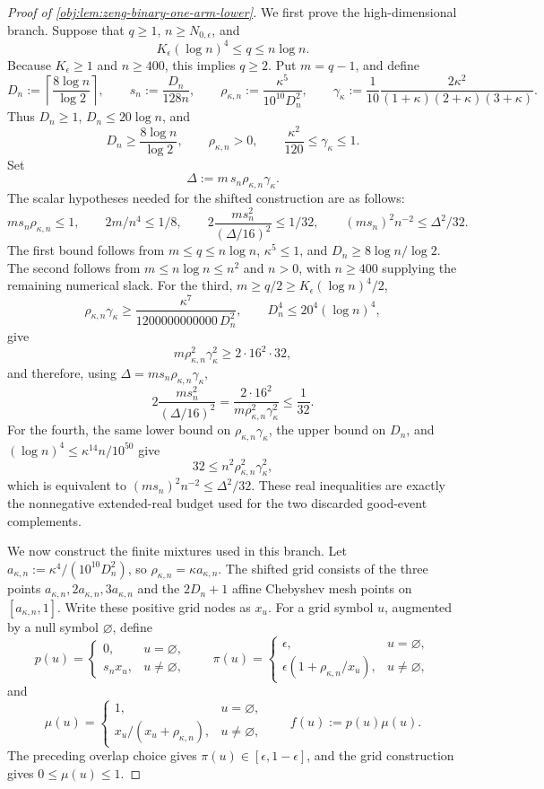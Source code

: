 \documentclass[11pt]{article}
\begin{document}
\begin{proof}[Proof of \cref{obj:lem:zeng-binary-one-arm-lower}]
We first prove the high-dimensional branch.  Suppose that \(q\ge1\), \(n\ge N_{0,\epsilon}\), and
\[
K_\epsilon(\log n)^4\le q\le n\log n .
\]
Because \(K_\epsilon\ge1\) and \(n\ge400\), this implies \(q\ge2\).  Put \(m=q-1\), and define
\[
D_n:=\left\lceil \frac{8\log n}{\log 2}\right\rceil,
\qquad
s_n:=\frac{D_n}{128n},
\qquad
\rho_{\kappa,n}:=\frac{\kappa^5}{10^{10}D_n^2},
\qquad
\gamma_\kappa:=\frac{1}{10}\frac{2\kappa^2}{(1+\kappa)(2+\kappa)(3+\kappa)}.
\]
Thus \(D_n\ge1\), \(D_n\le20\log n\), and
\[
D_n\ge \frac{8\log n}{\log 2},
\qquad
\rho_{\kappa,n}>0,
\qquad
\frac{\kappa^2}{120}\le\gamma_\kappa\le1.
\]
Set
\[
\Delta:=m\,s_n\rho_{\kappa,n}\gamma_\kappa .
\]
The scalar hypotheses needed for the shifted construction are as follows:
\[
m s_n\rho_{\kappa,n}\le 1,
\qquad
2m/n^4\le 1/8,
\qquad
2\frac{m s_n^2}{(\Delta/16)^2}\le 1/32,
\qquad
(m s_n)^2 n^{-2}\le \Delta^2/32 .
\]
The first bound follows from \(m\le q\le n\log n\), \(\kappa^5\le1\), and \(D_n\ge8\log n/\log2\).  The second follows from \(m\le n\log n\le n^2\) and \(n>0\), with \(n\ge400\) supplying the remaining numerical slack.  For the third, \(m\ge q/2\ge K_\epsilon(\log n)^4/2\),
\[
\rho_{\kappa,n}\gamma_\kappa
\ge
\frac{\kappa^7}{1200000000000\,D_n^2},
\qquad
D_n^4\le 20^4(\log n)^4,
\]
give
\[
m\rho_{\kappa,n}^2\gamma_\kappa^2
\ge 2\cdot 16^2\cdot 32,
\]
and therefore, using \(\Delta=m s_n\rho_{\kappa,n}\gamma_\kappa\),
\[
2\frac{m s_n^2}{(\Delta/16)^2}
=
\frac{2\cdot16^2}{m\rho_{\kappa,n}^2\gamma_\kappa^2}
\le \frac1{32}.
\]
For the fourth, the same lower bound on \(\rho_{\kappa,n}\gamma_\kappa\), the upper bound on \(D_n\), and \((\log n)^4\le \kappa^{14}n/10^{50}\) give
\[
32\le n^2\rho_{\kappa,n}^2\gamma_\kappa^2,
\]
which is equivalent to \((m s_n)^2 n^{-2}\le\Delta^2/32\).  These real inequalities are exactly the nonnegative extended-real budget used for the two discarded good-event complements.

We now construct the finite mixtures used in this branch.  Let \(a_{\kappa,n}:=\kappa^4/(10^{10}D_n^2)\), so \(\rho_{\kappa,n}=\kappa a_{\kappa,n}\).  The shifted grid consists of the three points \(a_{\kappa,n},2a_{\kappa,n},3a_{\kappa,n}\) and the \(2D_n+1\) affine Chebyshev mesh points on \([a_{\kappa,n},1]\).  Write these positive grid nodes as \(x_u\).  For a grid symbol \(u\), augmented by a null symbol \(\varnothing\), define
\[
p(u)=
\begin{cases}
0,&u=\varnothing,\\
s_n x_u,&u\ne\varnothing,
\end{cases}
\qquad
\pi(u)=
\begin{cases}
\epsilon,&u=\varnothing,\\
\epsilon\left(1+\rho_{\kappa,n}/x_u\right),&u\ne\varnothing,
\end{cases}
\]
and
\[
\mu(u)=
\begin{cases}
1,&u=\varnothing,\\
x_u/(x_u+\rho_{\kappa,n}),&u\ne\varnothing,
\end{cases}
\qquad
f(u):=p(u)\mu(u).
\]
The preceding overlap choice gives \(\pi(u)\in[\epsilon,1-\epsilon]\), and the grid construction gives \(0\le\mu(u)\le1\).


\end{proof}
\end{document}
